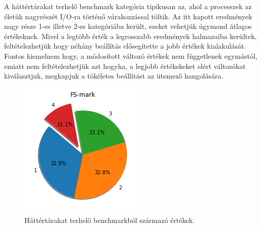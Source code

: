 A háttértárakat terhelő benchmark kategória tipikusan az, ahol a processzek az életük nagyrészét I/O-ra történő várakozzással töltik.
Az itt kapott eredmények nagy része 1-es illetve 2-es kategóriába került, ezeket vehetjük úgymond átlagos értékeknek. Mivel a legtöbb érték a legrosszabb eredmények halmazaiba kerültek, feltételezhetjük hogy néhány beállítás elősegítette a jobb értékek kialakulását. 
Fontos kiemelnem hogy, a módosított változó értékek nem függetlenek egymástól, emiatt nem feltételezhetjük azt hogyha, a legjobb értékekeket elért változókat kiválasztjuk, megkapjuk a tökéletes beállítást az ütemező hangolására.

\begin{figure}[h!]
\centering
\includegraphics[scale=0.6]{images/diskBenchmarkValue.png}
\caption{Háttértárakat terhelő benchmarkból származó értékek.}
\label{fig:diskChart}
\end{figure}


